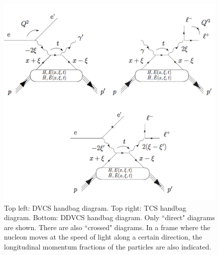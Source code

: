\begin{figure}[htbp]
\begin{center}
\includegraphics[width=1\textwidth]{3proc.pdf}
\end{center}
\caption{Top left: DVCS handbag diagram. Top right: TCS handbag diagram.
Bottom: DDVCS handbag diagram. Only ``direct" diagrams are shown. There are
also ``crossed" diagrams. In a frame where the nucleon
moves at the speed of light along a certain direction, the longitudinal 
momentum fractions of the particles are also indicated.}
\label{fig:diags}
\end{figure}

